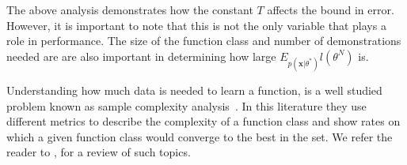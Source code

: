 \documentclass[10pt, conference]{ieeeconf}      %
\newcommand{\bx}{\mathbf{x}}
\begin{document}
The above analysis demonstrates how the constant $T$ affects the bound in error. However, it is important to note that this is not the only variable that plays a role in performance. The size of the function class and number of demonstrations needed are are also important in determining how large $E_{p(\bx|\theta^*)} l(\theta^N)$ is. 

Understanding how much data is needed to learn a function, is a well studied problem known as sample complexity analysis~\cite{anthony2009neural,bartlett2002rademacher,kakade2009complexity}. In this literature they use different metrics to describe the complexity of a function class and show rates on which a given function class would converge to the best in the set. We refer the reader to \cite{vapnik2013nature}, for a review of such topics. 
\end{document}
